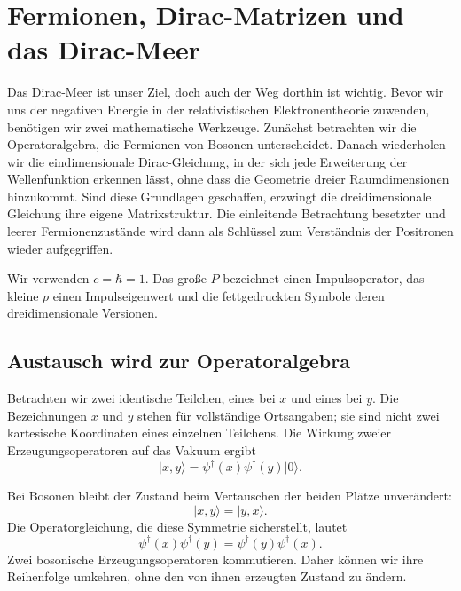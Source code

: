 \chapter{Fermionen, Dirac-Matrizen und das Dirac-Meer}

Das Dirac-Meer ist unser Ziel, doch auch der Weg dorthin ist wichtig. Bevor wir uns der negativen Energie in der relativistischen Elektronentheorie zuwenden, benötigen wir zwei mathematische Werkzeuge. Zunächst betrachten wir die Operatoralgebra, die Fermionen von Bosonen unterscheidet. Danach wiederholen wir die eindimensionale Dirac-Gleichung, in der sich jede Erweiterung der Wellenfunktion erkennen lässt, ohne dass die Geometrie dreier Raumdimensionen hinzukommt. Sind diese Grundlagen geschaffen, erzwingt die dreidimensionale Gleichung ihre eigene Matrixstruktur. Die einleitende Betrachtung besetzter und leerer Fermionenzustände wird dann als Schlüssel zum Verständnis der Positronen wieder aufgegriffen.

Wir verwenden \(c=\hbar=1\). Das große \(P\) bezeichnet einen Impulsoperator, das kleine \(p\) einen Impulseigenwert und die fettgedruckten Symbole deren dreidimensionale Versionen.

\section{Austausch wird zur Operatoralgebra}

Betrachten wir zwei identische Teilchen, eines bei \(x\) und eines bei \(y\). Die Bezeichnungen \(x\) und \(y\) stehen für vollständige Ortsangaben; sie sind nicht zwei kartesische Koordinaten eines einzelnen Teilchens. Die Wirkung zweier Erzeugungsoperatoren auf das Vakuum ergibt
\begin{equation}
\lvert x,y\rangle
=
\psi^\dagger(x)\psi^\dagger(y)\lvert0\rangle.
\label{eq:l10-two-particle-state}
\end{equation}

Bei Bosonen bleibt der Zustand beim Vertauschen der beiden Plätze unverändert:
\begin{equation}
\lvert x,y\rangle=\lvert y,x\rangle.
\end{equation}
Die Operatorgleichung, die diese Symmetrie sicherstellt, lautet
\begin{equation}
\psi^\dagger(x)\psi^\dagger(y)
=
\psi^\dagger(y)\psi^\dagger(x).
\label{eq:l10-boson-exchange}
\end{equation}
Zwei bosonische Erzeugungsoperatoren kommutieren. Daher können wir ihre Reihenfolge umkehren, ohne den von ihnen erzeugten Zustand zu ändern.

